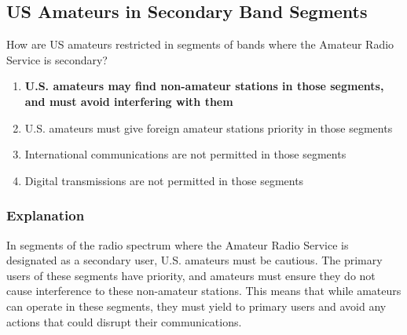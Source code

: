 \subsection{US Amateurs in Secondary Band Segments}
\label{T1B08}

\begin{tcolorbox}[colback=gray!10!white,colframe=black!75!black,title=T1B08]
How are US amateurs restricted in segments of bands where the Amateur Radio Service is secondary?
\begin{enumerate}[label=\Alph*,noitemsep]
    \item \textbf{U.S. amateurs may find non-amateur stations in those segments, and must avoid interfering with them}
    \item U.S. amateurs must give foreign amateur stations priority in those segments
    \item International communications are not permitted in those segments
    \item Digital transmissions are not permitted in those segments
\end{enumerate}
\end{tcolorbox}

\subsubsection*{Explanation}
In segments of the radio spectrum where the Amateur Radio Service is designated as a secondary user, U.S. amateurs must be cautious. The primary users of these segments have priority, and amateurs must ensure they do not cause interference to these non-amateur stations. This means that while amateurs can operate in these segments, they must yield to primary users and avoid any actions that could disrupt their communications.